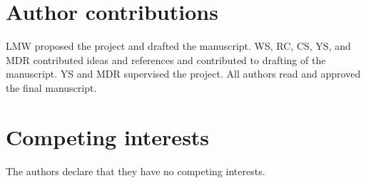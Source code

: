 \documentclass[12pt, a4paper]{article}
\begin{document}
\newpage

\section*{Author contributions}

LMW proposed the project and drafted the manuscript. WS, RC, CS, YS, and MDR contributed ideas and references and contributed to drafting of the manuscript. YS and MDR supervised the project. All authors read and approved the final manuscript.




\section*{Competing interests}

The authors declare that they have no competing interests.





\newpage


\singlespacing
\footnotesize




\end{document}
